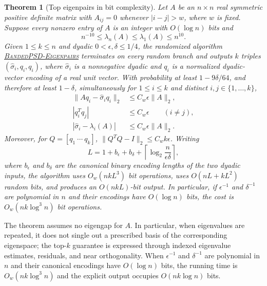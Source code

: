 \documentclass[11pt]{article}
\newtheorem{theorem}{Theorem}[section]
\newcommand{\BandedPSDEigenpairs}{%
  \textnormal{\textsc{BandedPSD-\hspace{0pt}Eigenpairs}}}
\begin{document}
\begin{theorem}[Top eigenpairs in bit complexity]
\label{thm:main}
Let $A$ be an $n\times n$ real symmetric positive definite matrix with
$A_{ij}=0$ whenever $|i-j|>w$, where $w$ is fixed.  Suppose every nonzero
entry of $A$ is an integer with $O(\log n)$ bits and
\[
 n^{-10}\leq\lambda_n(A)\leq\lambda_1(A)\leq n^{10}.
\]
Given $1\leq k\leq n$ and dyadic $0<\epsilon,\delta\leq1/4$, the randomized
algorithm \hyperref[alg:main]{\BandedPSDEigenpairs} terminates on
every random branch and outputs $k$ triples
$(\widehat\sigma_i,q_i,q_i)$, where $\widehat\sigma_i$ is a nonnegative
dyadic and $q_i$ is a normalized dyadic-vector encoding of a real unit vector.
With probability at least $1-9\delta/64$, and therefore at least
$1-\delta$, simultaneously for $1\leq i\leq k$ and distinct
$i,j\in\{1,\ldots,k\}$,
\begin{align*}
 \lVert Aq_i-\widehat\sigma_iq_i\rVert_2
   &\leq C_w\epsilon\lVert A\rVert_2,\\
 |q_i^Tq_j|&\leq C_w\epsilon\qquad(i\ne j),\\
 |\widehat\sigma_i-\lambda_i(A)|
   &\leq C_w\epsilon\lVert A\rVert_2.
\end{align*}
Moreover, for $Q=[q_1\ \cdots\ q_k]$,
$\lVert Q^TQ-I\rVert_2\leq C_wk\epsilon$.  Writing
\[
 L=1+b_\epsilon+b_\delta+
   \left\lceil\log_2\frac{n}{\epsilon\delta}\right\rceil,
\]
where $b_\epsilon$ and $b_\delta$ are the canonical binary encoding lengths
of the two dyadic inputs,
the algorithm uses $O_w(nkL^3)$ bit operations, uses
$O(nL+kL^2)$ random bits, and produces an $O(nkL)$-bit output.  In
particular, if $\epsilon^{-1}$ and
$\delta^{-1}$ are polynomial in $n$ and their encodings have $O(\log n)$
bits, the cost is $O_w(nk\log^3 n)$ bit operations.
\end{theorem}

The theorem assumes no eigengap for $A$.  In particular, when eigenvalues
are repeated, it does not single out a prescribed basis of the corresponding
eigenspace; the top-$k$ guarantee is expressed through indexed eigenvalue
estimates, residuals, and near orthogonality.  When $\epsilon^{-1}$ and
$\delta^{-1}$ are polynomial in $n$ and their canonical encodings have
$O(\log n)$ bits, the running time is $O_w(nk\log^3 n)$ and the explicit
output occupies $O(nk\log n)$ bits.
\end{document}
